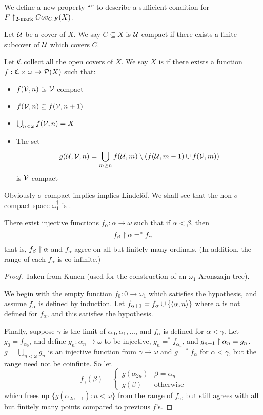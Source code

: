  We define a new property ``\scish'' to describe a sufficient condition for $F \uparrow_{2\text{-mark}}Cov_{C,F}(X)$.

  \begin{definition}
    Let $\mathcal{U}$ be a cover of $X$. We say $C\subseteq X$ is $\mathcal{U}$-compact if there exists a finite subcover of $\mathcal{U}$ which covers $C$.

    Let $\mathfrak{C}$ collect all the open covers of $X$. We say $X$ is \scish if there exists a function $f:\mathfrak{C}\times\omega\to\mathcal{P}(X)$ such that:
      \begin{itemize}
        \item $f(\mathcal{V},n)$ is $\mathcal{V}$-compact
        \item $f(\mathcal{V},n)\subseteq f(\mathcal{V},n+1)$
        \item $\bigcup_{n<\omega}f(\mathcal{V},n)=X$
        \item The set
          \[
            g(\mathcal{U},\mathcal{V},n) = \bigcup_{m\geq n} f(\mathcal{U},m)\setminus ( f(\mathcal{U},m-1)\cup f(\mathcal{V},m))
          \]
         is $\mathcal{V}$-compact
      \end{itemize}
  \end{definition}

  Obviously $\sigma$-compact implies \scish implies Lindel\"of. We shall see that the non-$\sigma$-compact space $\omega_1^\dagger$ is \scish.

   \begin{lemma}
    There exist injective functions $f_\alpha:\alpha\to\omega$ such that if $\alpha<\beta$, then \[f_\beta\restriction\alpha =^* f_\alpha\] that is, $f_\beta\restriction\alpha$ and $f_\alpha$ agree on all but finitely many ordinals. (In addition, the range of each $f_\alpha$ is co-infinite.)
  \end{lemma}

  \begin{proof}
    Taken from Kunen (used for the construction of an $\omega_1$-Aronszajn tree).

    We begin with the empty function $f_0:0\to\omega_1$ which satisfies the hypothesis, and assume $f_\alpha$ is defined by induction. Let $f_{\alpha+1} = f_\alpha \cup \{\langle\alpha,n\rangle\}$ where $n$ is not defined for $f_\alpha$, and this satisfies the hypothesis.

    Finally, suppose $\gamma$ is the limit of $\alpha_0,\alpha_1,\dots$, and $f_\alpha$ is defined for $\alpha<\gamma$. Let $g_0=f_{\alpha_0}$, and define $g_n : \alpha_n \to \omega$ to be injective, $g_n=^* f_{\alpha_n}$, and $g_{n+1} \restriction \alpha_n = g_n$. $g = \bigcup_{n<\omega} g_n$ is an injective function from $\gamma \to \omega$ and $g =^* f_\alpha$ for $\alpha <\gamma$, but the range need not be coinfinte. So let
    \[
      f_\gamma(\beta) = \left\{
      \begin{array}{ll}
        g(\alpha_{2n}) & \beta = \alpha_n \\
        g(\beta) & \text{otherwise}
      \end{array}
      \right.
    \]
    which frees up $\{g(\alpha_{2n+1}):n<\omega\}$ from the range of $f_\gamma$, but still agrees with all but finitely many points compared to previous $f$'s.
  \end{proof}

